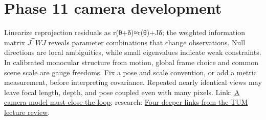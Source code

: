\section{Phase 11 camera development}\label{appendix-3ee9861904d5-phase-11-camera-development}

Linearize reprojection residuals as r(θ+δ)≈r(θ)+Jδ; the weighted information matrix \(J^{\mathsf T}WJ\) reveals parameter combinations that change observations. Null directions are local ambiguities, while small eigenvalues indicate weak constraints. In calibrated monocular structure from motion, global frame choice and common scene scale are gauge freedoms. Fix a pose and scale convention, or add a metric measurement, before interpreting covariance. Repeated nearly identical views may leave focal length, depth, and pose coupled even with many pixels. Link: \href{Continuous\%20Notes/Computing\%20Foundations\%20-\%20From\%20Bits\%20to\%20C++\%20and\%20Systems\%20APIs\#A\%20camera\%20model\%20must\%20close\%20the\%20loop}{A camera model must close the loop}; research: \href{Continuous\%20Notes/Computing\%20Foundations\%20-\%20From\%20Bits\%20to\%20C++\%20and\%20Systems\%20APIs\#Four\%20deeper\%20links\%20from\%20the\%20TUM\%20lecture\%20review}{Four deeper links from the TUM lecture review}.
